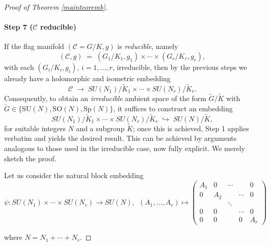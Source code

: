 \documentclass[reqno]{amsart}
\begin{document}
\begin{proof}[Proof of Theorem \ref{mainteoremb}]
\smallskip

\paragraph{\bf Step 7 ($\mathcal C$  reducible)}
If the flag manifold \((\mathcal C=G/K,g)\) is \emph{reducible}, namely 
\[
 (\mathcal C,g)\;=\;(G_1/K_1,g_1)\times\cdots\times(G_r/K_r,g_r),
\]
with each \((G_i/K_i,g_i)\), \(i=1,\dots,r\), irreducible, then by the previous steps we already have a holomorphic and isometric embedding
\[
\mathcal C
\;\longrightarrow\;
 SU(N_1)/\tilde K_1 \times \cdots \times SU(N_r)/\tilde K_r .
\]
Consequently, to obtain an \emph{irreducible} ambient space of the form
\(\tilde G/\tilde K\) with
\(\tilde G\in\{\mathrm{SU}(N),\mathrm{SO}(N),\mathrm{Sp}(N)\}\),
it suffices to construct an embedding
\[
SU(N_1)/\tilde K_1 \times \cdots \times SU(N_r)/\tilde K_r
\;\hookrightarrow\;
SU(N)/\tilde K,
\]
for suitable integers \(N\) and a subgroup 
\(\tilde K\); once this is achieved, Step 1 applies verbatim and yields the desired result.
This can be achieved by arguments analogous to those used in the irreducible case, now fully explicit. We merely sketch the proof.

Let us consider the natural block embedding
$$\psi: SU(N_1) \times \cdots \times SU(N_r) \rightarrow SU(N), \ \ (A_1, \dots, A_r) \mapsto 
\begin{pmatrix}
A_1 & 0   & \cdots &        & 0      \\
0   & A_2 &        & \cdots & 0      \\
     &     & \ddots &        &        \\
0   & 0   &        & \cdots & 0      \\
0   & 0   &        & 0      & A_r
\end{pmatrix}$$

where $N = N_1 + \cdots + N_r$. 



\end{proof}
\end{document}
